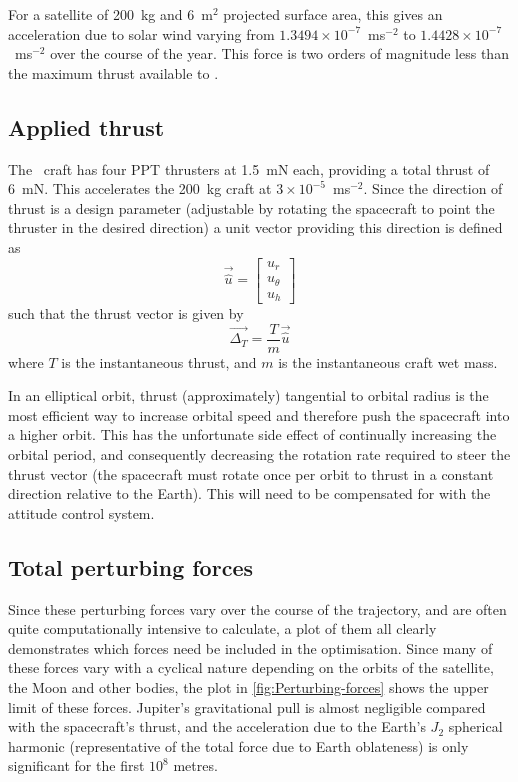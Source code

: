 For a satellite of 200~kg and 6~m$^2$ projected surface area, this gives an acceleration due to solar wind varying from $1.3494\times10^{-7}$~ms$^{-2}$ to $1.4428\times10^{-7}$~ms$^{-2}$ over the course of the year. This force is two orders of magnitude less than the maximum thrust available to \BW.




\subsection{Applied thrust} \label{sub:Applied-Thrust}

The \BW\ craft has four PPT thrusters at 1.5~mN each, providing a total thrust of 6~mN. This accelerates the 200~kg craft at $3\times10^{-5}$~ms$^{-2}$. Since the direction of thrust is a design parameter (adjustable by rotating the spacecraft to point the thruster in the desired direction) a unit vector providing this direction is defined as
\begin{equation}
\vec{\hat{u}}=\left[\begin{array}{c}
u_{r}\\
u_{\theta}\\
u_{h}
\end{array}\right]
\label{eq:thrust-vector}
\end{equation}
such that the thrust vector is given by 
\begin{equation}
\vec{\Delta_{T}}=\frac{T}{m}\vec{\hat{u}} \label{eq:thrust-perturbation}
\end{equation}
where $T$ is the instantaneous thrust, and $m$ is the instantaneous craft wet mass.

In an elliptical orbit, thrust (approximately) tangential to orbital radius is the most efficient way to increase orbital speed and therefore push the spacecraft into a higher orbit. This has the unfortunate side effect of continually increasing the orbital period, and consequently decreasing the rotation rate required to steer the thrust vector (the spacecraft must rotate once per orbit to thrust in a constant direction relative to the Earth). This will need to be compensated for with the attitude control system.

\subsection{Total perturbing forces}

Since these perturbing forces vary over the course of the trajectory, and are often quite computationally intensive to calculate, a plot of them all clearly demonstrates which forces need be included in the optimisation. Since many of these forces vary with a cyclical nature depending on the orbits of the satellite, the Moon and other bodies, the plot in \autoref{fig:Perturbing-forces} shows the upper limit of these forces. Jupiter's gravitational pull is almost negligible compared with the spacecraft's thrust, and the acceleration due to the Earth's $J_{2}$ spherical harmonic (representative of the total force due to Earth oblateness) is only significant for the first $10^{8}$ metres.

